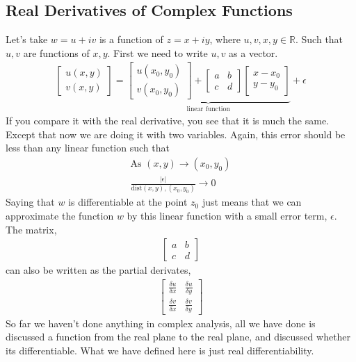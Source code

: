 \documentclass{article}
\begin{document}
\subsection{Real Derivatives of Complex Functions}
Let's take $w = u + iv$ is a function of $z = x + iy$, where $u, v, x, y \in \mathbb{R}$. Such that
$u, v$ are functions of $x,y$. First we need to write $u, v$ as a vector.
\begin{gather*}
	\begin{bmatrix}
		u(x,y) \\
		v(x,y)
	\end{bmatrix}
	=
	\underbrace{
		\begin{bmatrix}
			u(x_0, y_0) \\
			v(x_0, y_0)
		\end{bmatrix}
		+
		\begin{bmatrix}
			a & b \\
			c & d
		\end{bmatrix}
		\begin{bmatrix}
			x - x_0 \\
			y - y_0
		\end{bmatrix}
	}_{\text{linear function}}
	+ \epsilon
\end{gather*}
If you compare it with the real derivative, you see that it is much the same. Except that now we are
doing it with two variables. Again, this error should be less than any linear function such that
\begin{gather*}
	\text{As } (x,y) \rightarrow (x_0,y_0)\\
	\frac{|\epsilon|}{\text{dist}(x,y),(x_0,y_0)} \rightarrow 0
\end{gather*}
Saying that $w$ is differentiable at the point $z_0$ just means that we can approximate the function
$w$ by this linear function with a small error term, $\epsilon$. The matrix,
\begin{gather*}
	\begin{bmatrix}
		a & b \\
		c & d
	\end{bmatrix}
\end{gather*}
can also be written as the partial derivates,
\begin{gather*}
	\begin{bmatrix}
		\frac{\delta u}{\delta x} & \frac{\delta u}{\delta y} \\
		\frac{\delta v}{\delta x} & \frac{\delta v}{\delta y}
	\end{bmatrix}
\end{gather*}
So far we haven't done anything in complex analysis, all we have done is discussed a function from the
real plane to the real plane, and discussed whether its differentiable. What we have defined here
is just real differentiability.
\end{document}
